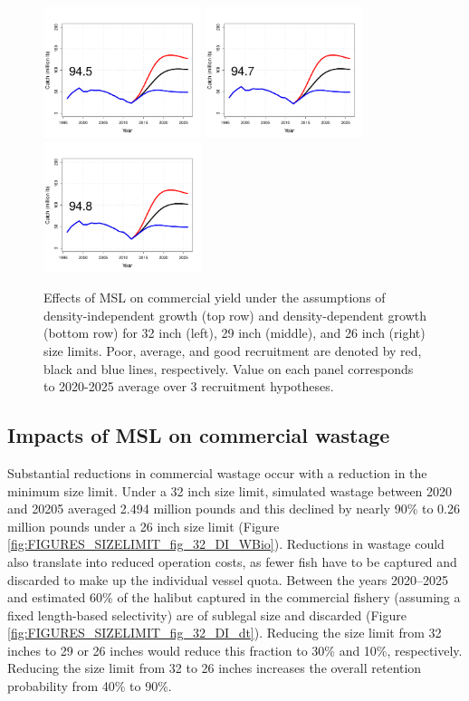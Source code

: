 \begin{figure}[htbp]
		\includegraphics[height=1.5in]{../FIGURES/SIZELIMIT/fig_32_DD_YBio.pdf}
		\includegraphics[height=1.5in]{../FIGURES/SIZELIMIT/fig_29_DD_YBio.pdf}
		\includegraphics[height=1.5in]{../FIGURES/SIZELIMIT/fig_26_DD_YBio.pdf}
	\caption{Effects of MSL on commercial yield under the assumptions of density-independent growth (top row) and density-dependent growth (bottom row) for 32 inch (left), 29 inch (middle), and 26 inch (right) size limits.  Poor, average, and good recruitment are denoted by red, black and blue lines, respectively.  Value on each panel corresponds to 2020-2025 average over 3 recruitment hypotheses.}
	\label{fig:FIGURES_SIZELIMIT_fig_32_DI_YBio}
\end{figure}

\subsection{Impacts of MSL on commercial wastage} %
\label{sub:impacts_of_msl_on_commercial_wastage}

Substantial reductions in commercial wastage occur with a reduction in the minimum size limit.  Under a 32 inch size limit, simulated wastage between 2020 and 20205 averaged 2.494 million pounds and this declined by nearly 90\% to 0.26 million pounds under a 26 inch size limit (Figure \ref{fig:FIGURES_SIZELIMIT_fig_32_DI_WBio}).  Reductions in wastage could also translate into reduced operation costs, as fewer fish have to be captured and discarded to make up the individual vessel quota.  Between the years 2020--2025 and estimated 60\% of the halibut captured in the commercial fishery (assuming a fixed length-based selectivity) are of sublegal size and discarded (Figure \ref{fig:FIGURES_SIZELIMIT_fig_32_DI_dt}).  Reducing the size limit from 32 inches to 29 or 26 inches would reduce this fraction to 30\% and 10\%, respectively.  Reducing the size limit from 32 to 26 inches increases the overall retention probability from 40\% to 90\%.  

